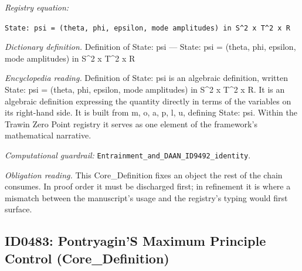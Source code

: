 \documentclass[11pt]{article}
\theoremstyle{remark}
\begin{document}
\noindent\textit{Registry equation:}\par
{\small\texttt{State: psi = (theta, phi, epsilon, mode amplitudes) in S\textasciicircum{}2 x T\textasciicircum{}2 x R}}\par\medskip
\noindent\textit{Dictionary definition.} Definition of State: psi --- State: psi = (theta, phi, epsilon, mode amplitudes) in S\textasciicircum{}2 x T\textasciicircum{}2 x R\par\medskip
\noindent\textit{Encyclopedia reading.} Definition of State: psi is an algebraic definition, written State: psi = (theta, phi, epsilon, mode amplitudes) in S\textasciicircum{}2 x T\textasciicircum{}2 x R. It is an algebraic definition expressing the quantity directly in terms of the variables on its right-hand side. It is built from m, o, a, p, l, u, defining State: psi. Within the Trawin Zero Point registry it serves as one element of the framework's mathematical narrative.
\par\medskip\noindent\textit{Computational guardrail:} \texttt{Entrainment\_and\_DAAN\_ID9492\_identity}.
\par\medskip\noindent\textit{Obligation reading.} This Core\_Definition fixes an object the rest of the chain consumes. In proof order it must be discharged first; in refinement it is where a mismatch between the manuscript's usage and the registry's typing would first surface.

\subsection{ID0483: Pontryagin'S Maximum Principle Control (Core\_Definition)}
\end{document}
